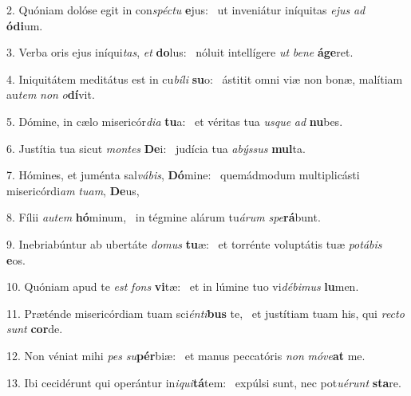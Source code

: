 2. Quóniam dolóse egit in con\textit{spéc}\textit{tu} \textbf{e}jus: \ast\  ut inveniátur iníquitas \textit{e}\textit{jus} \textit{ad} \textbf{ó}\textbf{di}um.\

3. Verba oris ejus iníqui\textit{tas}, \textit{et} \textbf{do}lus: \ast\  nóluit intellígere \textit{ut} \textit{be}\textit{ne} \textbf{á}\textbf{ge}ret.\

4. Iniquitátem meditátus est in cu\textit{bí}\textit{li} \textbf{su}o: \ast\  ástitit omni viæ non bonæ, malítiam au\textit{tem} \textit{non} \textit{o}\textbf{dí}vit.\

5. Dómine, in cælo misericór\textit{di}\textit{a} \textbf{tu}a: \ast\  et véritas tua \textit{us}\textit{que} \textit{ad} \textbf{nu}bes.\

6. Justítia tua sicut \textit{mon}\textit{tes} \textbf{De}i: \ast\  judícia tua \textit{a}\textit{býs}\textit{sus} \textbf{mul}ta.\

7. Hómines, et juménta sal\textit{vá}\textit{bis}, \textbf{Dó}mine: \ast\  quemádmodum multiplicásti misericórdi\textit{am} \textit{tu}\textit{am}, \textbf{De}us,\

8. Fílii \textit{au}\textit{tem} \textbf{hó}minum, \ast\  in tégmine alárum tu\textit{á}\textit{rum} \textit{spe}\textbf{rá}bunt.\

9. Inebriabúntur ab ubertáte \textit{do}\textit{mus} \textbf{tu}æ: \ast\  et torrénte voluptátis tuæ \textit{po}\textit{tá}\textit{bis} \textbf{e}os.\

10. Quóniam apud te \textit{est} \textit{fons} \textbf{vi}tæ: \ast\  et in lúmine tuo vi\textit{dé}\textit{bi}\textit{mus} \textbf{lu}men.\

11. Præténde misericórdiam tuam sci\textit{én}\textit{ti}\textbf{bus} te, \ast\  et justítiam tuam his, qui \textit{rec}\textit{to} \textit{sunt} \textbf{cor}de.\

12. Non véniat mihi \textit{pes} \textit{su}\textbf{pér}biæ: \ast\  et manus peccatóris \textit{non} \textit{mó}\textit{ve}\textbf{at} me.\

13. Ibi cecidérunt qui operántur in\textit{i}\textit{qui}\textbf{tá}tem: \ast\  expúlsi sunt, nec pot\textit{u}\textit{é}\textit{runt} \textbf{sta}re.\

